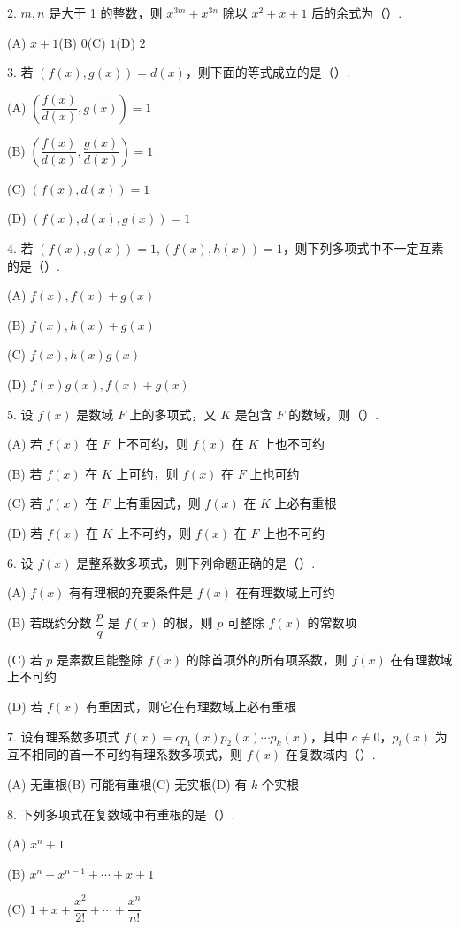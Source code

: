\documentclass[UTF8, 12pt, fontset=fandol, oneside]{ctexart}
\begin{document}
2. $m,n$ 是大于 1 的整数，则 $x^{3m}+x^{3n}$ 除以 $x^2+x+1$ 后的余式为（\quad ）.

(A) $x+1$\quad (B) $0$\quad (C) $1$\quad (D) $2$

3. 若 $(f(x),g(x))=d(x)$，则下面的等式成立的是（\quad ）.

(A) $\left(\dfrac{f(x)}{d(x)},g(x)\right)=1$

(B) $\left(\dfrac{f(x)}{d(x)},\dfrac{g(x)}{d(x)}\right)=1$

(C) $(f(x),d(x))=1$

(D) $(f(x),d(x),g(x))=1$

4. 若 $(f(x),g(x))=1,(f(x),h(x))=1$，则下列多项式中不一定互素的是（\quad ）.

(A) $f(x),f(x)+g(x)$

(B) $f(x),h(x)+g(x)$

(C) $f(x),h(x)g(x)$

(D) $f(x)g(x),f(x)+g(x)$

5. 设 $f(x)$ 是数域 $F$ 上的多项式，又 $K$ 是包含 $F$ 的数域，则（\quad ）.

(A) 若 $f(x)$ 在 $F$ 上不可约，则 $f(x)$ 在 $K$ 上也不可约

(B) 若 $f(x)$ 在 $K$ 上可约，则 $f(x)$ 在 $F$ 上也可约

(C) 若 $f(x)$ 在 $F$ 上有重因式，则 $f(x)$ 在 $K$ 上必有重根

(D) 若 $f(x)$ 在 $K$ 上不可约，则 $f(x)$ 在 $F$ 上也不可约

6. 设 $f(x)$ 是整系数多项式，则下列命题正确的是（\quad ）.

(A) $f(x)$ 有有理根的充要条件是 $f(x)$ 在有理数域上可约

(B) 若既约分数 $\dfrac{p}{q}$ 是 $f(x)$ 的根，则 $p$ 可整除 $f(x)$ 的常数项

(C) 若 $p$ 是素数且能整除 $f(x)$ 的除首项外的所有项系数，则 $f(x)$ 在有理数域上不可约

(D) 若 $f(x)$ 有重因式，则它在有理数域上必有重根

7. 设有理系数多项式 $f(x)=cp_1(x)p_2(x)\cdots p_k(x)$，其中 $c\ne0$，$p_i(x)$ 为互不相同的首一不可约有理系数多项式，则 $f(x)$ 在复数域内（\quad ）.

(A) 无重根\quad (B) 可能有重根\quad (C) 无实根\quad (D) 有 $k$ 个实根

8. 下列多项式在复数域中有重根的是（\quad ）.

(A) $x^n+1$

(B) $x^n+x^{n-1}+\cdots+x+1$

(C) $1+x+\dfrac{x^2}{2!}+\cdots+\dfrac{x^n}{n!}$
\end{document}
